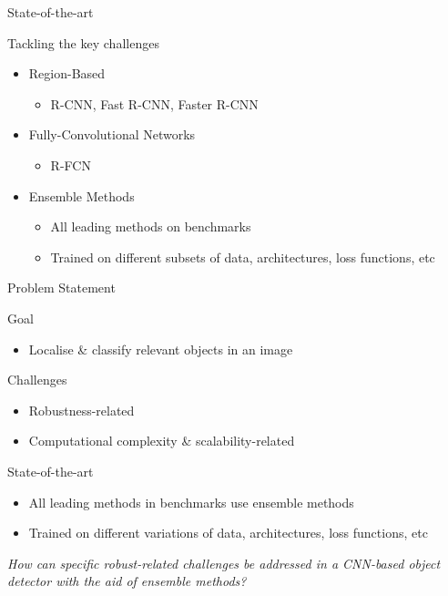 \begin{frame}{State-of-the-art}{}
        \begin{block}{Tackling the key challenges}
        \begin{itemize}
            \item Region-Based
            \begin{itemize}
                \item R-CNN, Fast R-CNN, Faster R-CNN
            \end{itemize}
            \item Fully-Convolutional Networks
            \begin{itemize}
                \item R-FCN
            \end{itemize}
            \item Ensemble Methods
            \begin{itemize}
                \item All leading methods on benchmarks
                \item Trained on different subsets of data, architectures, loss functions, etc
            \end{itemize}
        \end{itemize}            
        \end{block}
\end{frame}

\begin{frame}{Problem Statement}{}
        \begin{block}{Goal}
            \begin{itemize}
                \item Localise \& classify relevant objects in an image
            \end{itemize}            
        \end{block}
        \begin{block}{Challenges}
            \begin{itemize}
                \item Robustness-related
                \item Computational complexity \& scalability-related
            \end{itemize}            
        \end{block}
        \begin{block}{State-of-the-art}
            \begin{itemize}
                \item All leading methods in benchmarks use ensemble methods
                \item Trained on different variations of data, architectures, loss functions, etc
            \end{itemize}            
        \end{block}

        \textit{How can specific robust-related challenges be addressed in a CNN-based object detector with the aid of ensemble methods?}
\end{frame}

